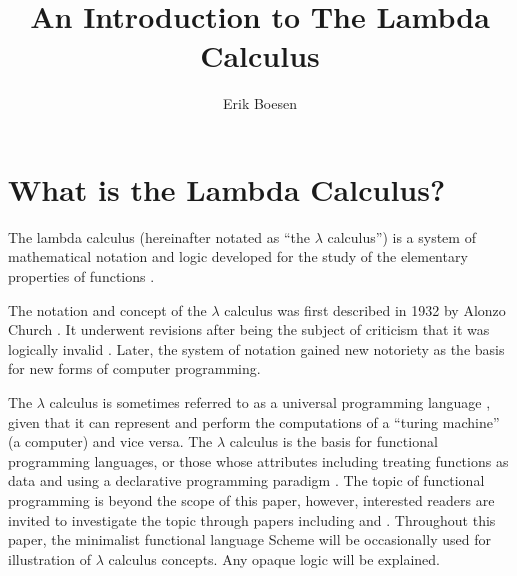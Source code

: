 \documentclass{article}
\begin{document}
\title{An Introduction to The Lambda Calculus}
\author{Erik Boesen}
\maketitle

\begin{abstract}
\end{abstract}

\section{What is the Lambda Calculus?}
The lambda calculus (hereinafter notated as ``the $\lambda$ calculus'') is a system of mathematical notation and logic developed for the study of the elementary properties of functions \cite{rojastutorial}.

The notation and concept of the $\lambda$ calculus was first described in 1932 by Alonzo Church \cite{church}. It underwent revisions after being the subject of criticism that it was logically invalid \cite{church2}. Later, the system of notation gained new notoriety as the basis for new forms of computer programming.

The $\lambda$ calculus is sometimes referred to as a universal programming language \cite{rojastutorial}, given that it can represent and perform the computations of a ``turing machine'' (a computer) and vice versa. The $\lambda$ calculus is the basis for functional programming languages, or those whose attributes including treating functions as data and using a declarative programming paradigm \cite{hudakevolution}. The topic of functional programming is beyond the scope of this paper, however, interested readers are invited to investigate the topic through papers including \cite{totalfp} and \cite{hudakevolution}. Throughout this paper, the minimalist functional language Scheme will be occasionally used for illustration of $\lambda$ calculus concepts. Any opaque logic will be explained.
\end{document}
